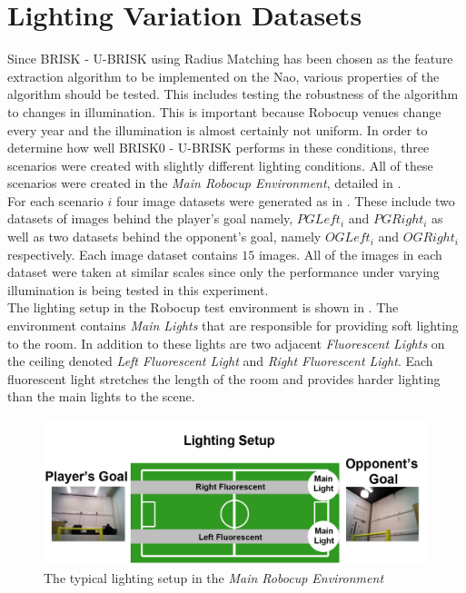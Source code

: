 \section{Lighting Variation Datasets}
\label{sec:lighting}
Since BRISK - U-BRISK using Radius Matching has been chosen as the feature extraction algorithm to be implemented on the Nao, various properties of the algorithm should be tested. This includes testing the robustness of the algorithm to changes in illumination. This is important because Robocup venues change every year and the illumination is almost certainly not uniform. In order to determine how well BRISK0 - U-BRISK performs in these conditions, three scenarios were created with slightly different lighting conditions. All of these scenarios were created in the \textit{Main Robocup Environment}, detailed in .\\ 

For each scenario $i$ four image datasets were generated as in . These include  two datasets of images behind the player's goal namely, \textit{$PG Left_{i}$} and \textit{$PG Right_i$} as well as two datasets behind the opponent's goal, namely \textit{$OG Left_i$} and \textit{$OG Right_i$} respectively. Each image dataset contains $15$ images. All of the images in each dataset were taken at similar scales since only the performance under varying illumination is being tested in this experiment.\\ 

The lighting setup in the Robocup test environment is shown in  . The environment contains \textit{Main Lights} that are responsible for providing soft lighting to the room. In addition to these lights are two adjacent \textit{Fluorescent Lights} on the ceiling denoted \textit{Left Fluorescent Light} and \textit{Right Fluorescent Light}. Each fluorescent light stretches the length of the room and provides harder lighting than the main lights to the scene. \\

\begin{figure}[h!] 
  \centering
    \includegraphics[width=1.0\textwidth]{../Drawings/lighting/LightingSetup.jpg}
    \caption{The typical lighting setup in the \textit{Main Robocup Environment}}
    \label{fig:lighting_setup}
\end{figure}


